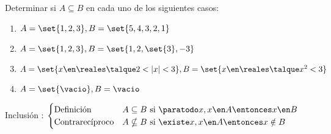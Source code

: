 \begin{enunciado}{\ejercicio}
  Determinar si $A \subseteq B$ en cada uno de los siguientes casos:
  \begin{enumerate}[label=\roman*)]
    \item $ A = \set{1, 2, 3}, B = \set{5,4,3,2,1}$
    \item $ A = \set{1, 2, 3}, B = \set{1,2,\set{3},-3}$
    \item $ A = \set{x \en \reales \talque 2<|x|<3}, B = \set{x \en \reales \talque x^2 < 3 }$
    \item $ A = \set{\vacio}, B = \vacio $
  \end{enumerate}
\end{enunciado}

Inclusión :
$
  \begin{cases}
    \text{Definición}      & A \subseteq B \text{ si } \paratodo x, x \en A \entonces x \en B   \\
    \text{Contrarecíproco} & A \nsubseteq B \text{ si } \existe x, x \en A \entonces x \notin B
  \end{cases}
$

